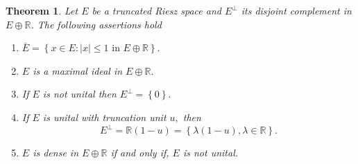 \documentclass{birkau}
\numberwithin{equation}{section}
\theoremstyle{plain}
\newtheorem{theorem}{Theorem}[section]
\theoremstyle{definition}
\begin{document}
\begin{theorem}
	Let $E$ be a truncated Riesz space and $E^{\perp}$ its disjoint complement in
	$E\oplus%
	\mathbb{R}
	$. The following assertions hold
	\begin{enumerate}
		\item $\bar{E}=\left\{ x\in E:\mid x\mid \leq 1\text{ in }E\oplus 
		\mathbb{R}
		\right\} .$
		\item $E$ is a maximal ideal in $E\oplus%
		\mathbb{R}
		.$
		\item If $E$ is not unital then $E^{\perp}=\left\{  0\right\}  .$
		\item If $E$ is unital with truncation unit $u,$ then
		\[
		E^{\perp}=%
		\mathbb{R}
		\left(  1-u\right)  =\left\{  \lambda\left(  1-u\right)  ,\lambda\in%
		\mathbb{R}
		\right\}  .
		\]
		\item $E$ is dense in $E\oplus%
		\mathbb{R}
		$ if and only if, $E$ is not unital.
	\end{enumerate}
\end{theorem}
\end{document}

